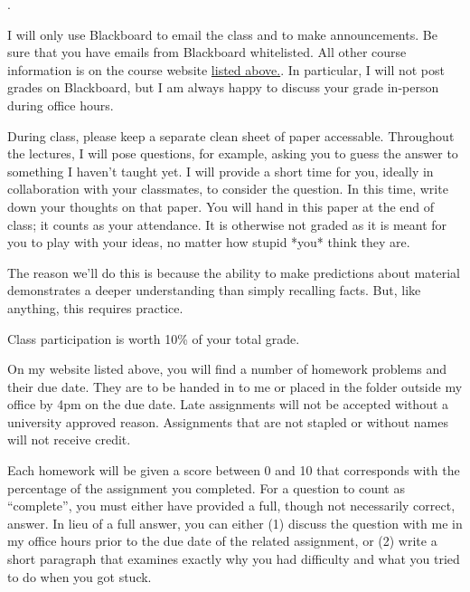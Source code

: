\documentclass{assets/syllabus}
\begin{document}
\Coursetext.


I will only use Blackboard to email the class and to make
announcements.  Be sure that you have emails from Blackboard
whitelisted. All other course information is on the course
website
\href{https://danielmichaelcicala.github.io/teaching}{listed
  above.}.  In particular, I will not post grades on
Blackboard, but I am always happy to discuss your grade in-person
during office hours.


During class, please keep a separate clean sheet of paper
accessable.  Throughout the lectures, I will pose questions,
for example, asking you to guess the answer to something I
haven't taught yet. I will provide a short time for you,
ideally in collaboration with your classmates, to consider
the question. In this time, write down your thoughts on that
paper.  You will hand in this paper at the end of class; it
counts as your attendance. It is otherwise not graded as it
is meant for you to play with your ideas, no matter how
stupid *you* think they are.

The reason we'll do this is because the ability to make
predictions about material demonstrates a deeper
understanding than simply recalling facts. But, like
anything, this requires practice.

Class participation is worth 10\% of your total grade.


On my website listed above, you will find a number of
homework problems and their due date. They are to be handed
in to me or placed in the folder outside my office by 4pm on
the due date. Late assignments will not be accepted without
a university approved reason. Assignments that are not
stapled or without names will not receive credit.

Each homework will be given a score between 0 and 10 that
corresponds with the percentage of the assignment you
completed. For a question to count as ``complete'', you must
either have provided a full, though not necessarily correct,
answer. In lieu of a full answer, you can either (1) discuss
the question with me in my office hours prior to the due
date of the related assignment, or (2) write a short
paragraph that examines exactly why you had difficulty and
what you tried to do when you got stuck.
\end{document}
